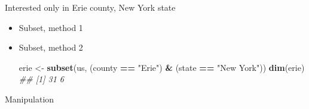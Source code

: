 \documentclass[
]{book}
\newenvironment{Shaded}{\begin{snugshade}}{\end{snugshade}}
\newcommand{\CommentTok}[1]{\textcolor[rgb]{0.56,0.35,0.01}{\textit{#1}}}
\newcommand{\KeywordTok}[1]{\textcolor[rgb]{0.13,0.29,0.53}{\textbf{#1}}}
\newcommand{\NormalTok}[1]{#1}
\newcommand{\OperatorTok}[1]{\textcolor[rgb]{0.81,0.36,0.00}{\textbf{#1}}}
\newcommand{\StringTok}[1]{\textcolor[rgb]{0.31,0.60,0.02}{#1}}
\begin{document}
Interested only in Erie county, New York state

\begin{itemize}
\item
  Subset, method 1

\begin{Shaded}
\end{Shaded}
\item
  Subset, method 2

\begin{Shaded}
\begin{Highlighting}[]
\NormalTok{erie <-}\StringTok{ }\KeywordTok{subset}\NormalTok{(us, (county }\OperatorTok{==}\StringTok{ "Erie"}\NormalTok{) }\OperatorTok{&}\StringTok{ }\NormalTok{(state }\OperatorTok{==}\StringTok{ "New York"}\NormalTok{))}
\KeywordTok{dim}\NormalTok{(erie)}
\CommentTok{## [1] 31  6}
\end{Highlighting}
\end{Shaded}
\end{itemize}

Manipulation
\end{document}
